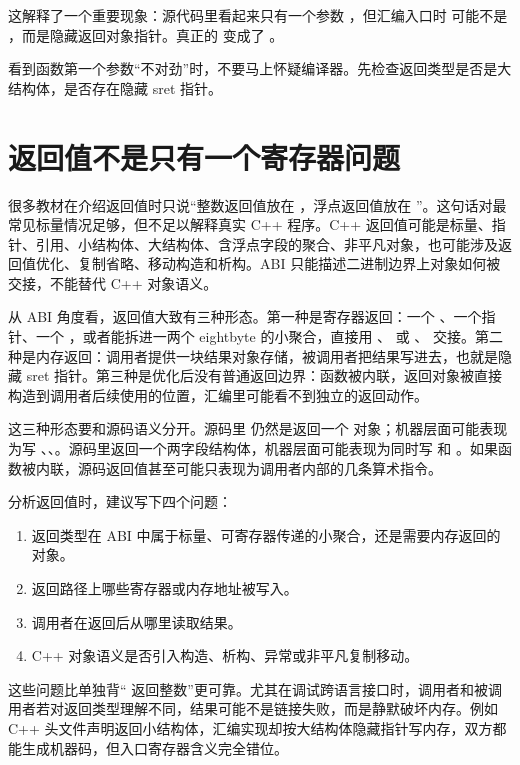 这解释了一个重要现象：源代码里看起来只有一个参数 ，但汇编入口时  可能不是 ，而是隐藏返回对象指针。真正的  变成了 。

\begin{keyidea}
看到函数第一个参数“不对劲”时，不要马上怀疑编译器。先检查返回类型是否是大结构体，是否存在隐藏 sret 指针。
\end{keyidea}

\section{返回值不是只有一个寄存器问题}

很多教材在介绍返回值时只说“整数返回值放在 ，浮点返回值放在 ”。这句话对最常见标量情况足够，但不足以解释真实 C++ 程序。C++ 返回值可能是标量、指针、引用、小结构体、大结构体、含浮点字段的聚合、非平凡对象，也可能涉及返回值优化、复制省略、移动构造和析构。ABI 只能描述二进制边界上对象如何被交接，不能替代 C++ 对象语义。

从 ABI 角度看，返回值大致有三种形态。第一种是寄存器返回：一个 、一个指针、一个 ，或者能拆进一两个 eightbyte 的小聚合，直接用 、 或 、 交接。第二种是内存返回：调用者提供一块结果对象存储，被调用者把结果写进去，也就是隐藏 sret 指针。第三种是优化后没有普通返回边界：函数被内联，返回对象被直接构造到调用者后续使用的位置，汇编里可能看不到独立的返回动作。

这三种形态要和源码语义分开。源码里  仍然是返回一个  对象；机器层面可能表现为写 \code{[rdi]}、\code{[rdi + 8]}、\code{[rdi + 16]}。源码里返回一个两字段结构体，机器层面可能表现为同时写  和 。如果函数被内联，源码返回值甚至可能只表现为调用者内部的几条算术指令。

分析返回值时，建议写下四个问题：

\begin{enumerate}
  \item 返回类型在 ABI 中属于标量、可寄存器传递的小聚合，还是需要内存返回的对象。
  \item 返回路径上哪些寄存器或内存地址被写入。
  \item 调用者在返回后从哪里读取结果。
  \item C++ 对象语义是否引入构造、析构、异常或非平凡复制移动。
\end{enumerate}

这些问题比单独背“ 返回整数”更可靠。尤其在调试跨语言接口时，调用者和被调用者若对返回类型理解不同，结果可能不是链接失败，而是静默破坏内存。例如 C++ 头文件声明返回小结构体，汇编实现却按大结构体隐藏指针写内存，双方都能生成机器码，但入口寄存器含义完全错位。

